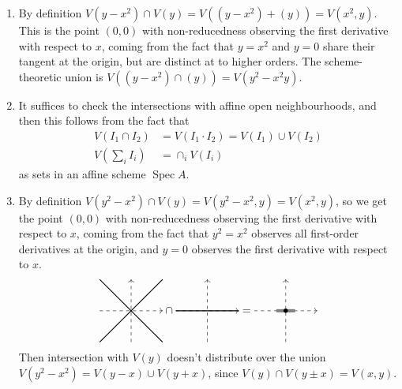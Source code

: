 \documentclass{report}
\newcommand{\tsum}{{\textstyle\sum}} %
\DeclareMathOperator{\Spec}{Spec}
\begin{document}
\begin{enumerate}[label=\textbf{8.1.\Alph*.}]
\begin{enumerate}[label=(\alph*)]
		      \item By definition $V(y-x^2)\cap V(y)=V((y-x^2)+(y))=V(x^2,y)$.
		            This is the point $(0,0)$ with non-reducedness observing the
		            first derivative with respect to $x$, coming from the fact that
		            $y=x^2$ and $y=0$ share their tangent at the origin, but are
		            distinct at to higher orders. The scheme-theoretic union is
		            $V((y-x^2)\cap(y))=V(y^2-x^2y)$.

		      \item It suffices to check the intersections with affine open
		            neighbourhoods, and then this follows from the fact that
		            \begin{align*}
			            V(I_1\cap I_2) & = V(I_1\cdot I_2)=V(I_1)\cup V(I_2) \\
			            V(\tsum_iI_i)  & = \cap_iV(I_i)
		            \end{align*}
		            as sets in an affine scheme $\Spec A$.

		      \item By definition $V(y^2-x^2)\cap V(y)=V(y^2-x^2,y)=V(x^2,y)$, so
		            we get the point $(0,0)$ with non-reducedness observing the
		            first derivative with respect to $x$, coming from the fact that
		            $y^2=x^2$ observes all first-order derivatives at the origin,
		            and $y=0$ observes the first derivative with respect to $x$.
		            \begin{equation*}
			            \vcenter{\hbox{\begin{tikzpicture}
						            \draw[dashed,->] (-1,0) -- (1,0);
						            \draw[dashed,->] (0,-1) -- (0,1);
						            \draw[thick] (-1,-1) -- (1,1);
						            \draw[thick] (-1,1) -- (1,-1);
					            \end{tikzpicture}}}
			            \cap
			            \vcenter{\hbox{\begin{tikzpicture}
						            \draw[dashed,->] (-1,0) -- (1,0);
						            \draw[dashed,->] (0,-1) -- (0,1);
						            \draw[thick] (-1,0) -- (1,0);
					            \end{tikzpicture}}}
			            =
			            \vcenter{\hbox{\begin{tikzpicture}
						            \draw[dashed,->] (-1,0) -- (1,0);
						            \draw[dashed,->] (0,-1) -- (0,1);
						            \fill[gray] (-0.3,-0.05) -- (0.3,-0.05) -- (0.3,0.05) -- (-0.3,0.05);
						            \fill (0,0) circle[radius=2pt];
					            \end{tikzpicture}}}
		            \end{equation*}
		            Then intersection with $V(y)$ doesn't distribute over the union
		            $V(y^2-x^2)=V(y-x)\cup V(y+x)$, since $V(y)\cap V(y\pm x)=V(x,y)$.
	      \end{enumerate}


\end{enumerate}
\end{document}
